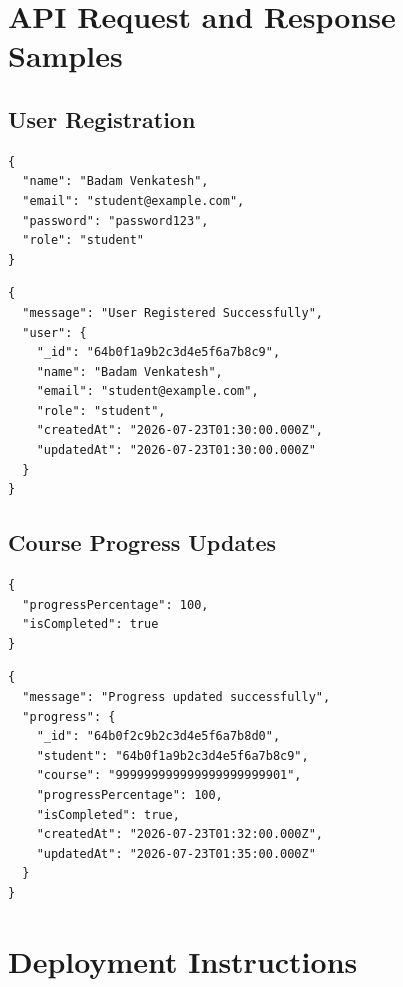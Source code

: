\documentclass[12pt,a4paper]{report}
\begin{document}
\section{API Request and Response Samples}

\subsection{User Registration}

\begin{lstlisting}[caption={POST /api/auth/register -- Request Payload}, label={lst:register_req}]
{
  "name": "Badam Venkatesh",
  "email": "student@example.com",
  "password": "password123",
  "role": "student"
}
\end{lstlisting}

\begin{lstlisting}[caption={POST /api/auth/register -- Response Body (201)}, label={lst:register_res}]
{
  "message": "User Registered Successfully",
  "user": {
    "_id": "64b0f1a9b2c3d4e5f6a7b8c9",
    "name": "Badam Venkatesh",
    "email": "student@example.com",
    "role": "student",
    "createdAt": "2026-07-23T01:30:00.000Z",
    "updatedAt": "2026-07-23T01:30:00.000Z"
  }
}
\end{lstlisting}

\subsection{Course Progress Updates}

\begin{lstlisting}[caption={POST /api/courses/:id/progress -- Request Payload}, label={lst:progress_req}]
{
  "progressPercentage": 100,
  "isCompleted": true
}
\end{lstlisting}

\begin{lstlisting}[caption={POST /api/courses/:id/progress -- Response Body (200)}, label={lst:progress_res}]
{
  "message": "Progress updated successfully",
  "progress": {
    "_id": "64b0f2c9b2c3d4e5f6a7b8d0",
    "student": "64b0f1a9b2c3d4e5f6a7b8c9",
    "course": "999999999999999999999901",
    "progressPercentage": 100,
    "isCompleted": true,
    "createdAt": "2026-07-23T01:32:00.000Z",
    "updatedAt": "2026-07-23T01:35:00.000Z"
  }
}
\end{lstlisting}

\section{Deployment Instructions}
\end{document}

